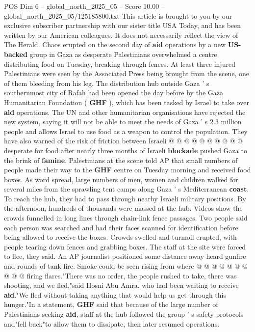 \begin{textsample}{POS Dim 6 – global\_north\_2025\_05 – Score 10.00 – global\_north\_2025\_05/125185800.txt}  \label{ex:f6_pos_066}
This article is brought to you by our exclusive subscriber partnership with our sister title USA Today, and has been written by our American colleagues.
It does not necessarily reflect the view of The Herald.
Chaos erupted on the second day of \textbf{aid} operations by a new \textbf{US-backed} group in Gaza as desperate Palestinians overwhelmed a centre distributing food on Tuesday, breaking through fences.
At least three injured Palestinians were seen by the Associated Press being brought from the scene, one of them bleeding from his leg.
The distribution hub outside Gaza ' s southernmost city of Rafah had been opened the day before by the Gaza Humanitarian Foundation ( \textbf{GHF} ), which has been tasked by Israel to take over \textbf{aid} operations.
The UN and other humanitarian organisations have rejected the new system, saying it will not be able to meet the needs of Gaza ' s 2.3 million people and allows Israel to use food as a weapon to control the population.
They have also warned of the risk of friction between Israeli @ @ @ @ @ @ @ @ @ @ desperate for food after nearly three months of Israeli \textbf{blockade} pushed Gaza to the brink of \textbf{famine}.
Palestinians at the scene told AP that small numbers of people made their way to the \textbf{GHF} centre on Tuesday morning and received food boxes.
As word spread, large numbers of men, women and children walked for several miles from the sprawling tent camps along Gaza ' s Mediterranean \textbf{coast}.
To reach the hub, they had to pass through nearby Israeli military positions.
By the afternoon, hundreds of thousands were massed at the hub.
Videos show the crowds funnelled in long lines through chain-link fence passages.
Two people said each person was searched and had their faces scanned for identification before being allowed to receive the boxes.
Crowds swelled and turmoil erupted, with people tearing down fences and grabbing boxes.
The staff at the site were forced to flee, they said.
An AP journalist positioned some distance away heard gunfire and rounds of tank fire.
Smoke could be seen rising from where @ @ @ @ @ @ @ @ @ @ firing flares."There was no order, the people rushed to take, there was shooting, and we fled,"said Hosni Abu Amra, who had been waiting to receive \textbf{aid}."We fled without taking anything that would help us get through this hunger."In a statement, \textbf{GHF} said that because of the large number of Palestinians seeking \textbf{aid}, staff at the hub followed the group ' s safety protocols and"fell back"to allow them to dissipate, then later resumed operations.

\end{textsample}
